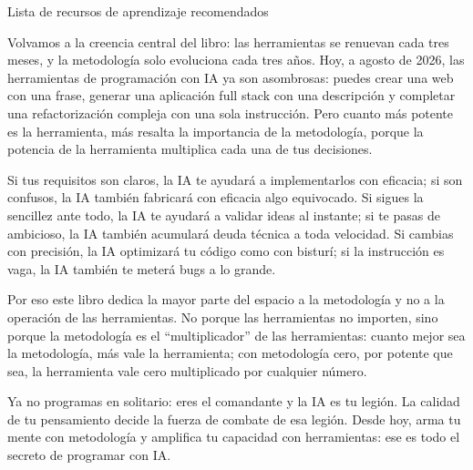 \begin{center}\small\color{gray}Lista de recursos de aprendizaje recomendados\end{center}


Volvamos a la creencia central del libro: las herramientas se renuevan cada tres meses, y la metodología solo evoluciona cada tres años. Hoy, a agosto de 2026, las herramientas de programación con IA ya son asombrosas: puedes crear una web con una frase, generar una aplicación full stack con una descripción y completar una refactorización compleja con una sola instrucción. Pero cuanto más potente es la herramienta, más resalta la importancia de la metodología, porque la potencia de la herramienta multiplica cada una de tus decisiones.

Si tus requisitos son claros, la IA te ayudará a implementarlos con eficacia; si son confusos, la IA también fabricará con eficacia algo equivocado. Si sigues la sencillez ante todo, la IA te ayudará a validar ideas al instante; si te pasas de ambicioso, la IA también acumulará deuda técnica a toda velocidad. Si cambias con precisión, la IA optimizará tu código como con bisturí; si la instrucción es vaga, la IA también te meterá bugs a lo grande.

Por eso este libro dedica la mayor parte del espacio a la metodología y no a la operación de las herramientas. No porque las herramientas no importen, sino porque la metodología es el “multiplicador” de las herramientas: cuanto mejor sea la metodología, más vale la herramienta; con metodología cero, por potente que sea, la herramienta vale cero multiplicado por cualquier número.

Ya no programas en solitario: eres el comandante y la IA es tu legión. La calidad de tu pensamiento decide la fuerza de combate de esa legión. Desde hoy, arma tu mente con metodología y amplifica tu capacidad con herramientas: ese es todo el secreto de programar con IA.


